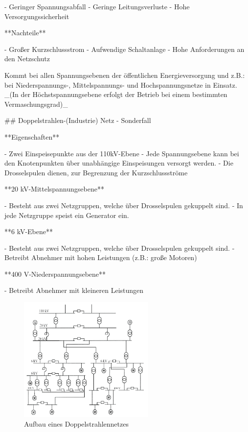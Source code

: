 \begin{markdown}
- Geringer Spannungsabfall
- Geringe Leitungsverluste
- Hohe Versorgungssicherheit

**Nachteile**

- Großer Kurzschlussstrom
- Aufwendige Schaltanlage
- Hohe Anforderungen an den Netzschutz

Kommt bei allen Spannungsebenen der öffentlichen Energieversorgung und z.B.: bei Niederspannungs-, Mittelspannungs- und Hochspannungsnetze in Einsatz. _(In der Höchstspannungsebene erfolgt der Betrieb bei einem bestimmten Vermaschungsgrad)_

\newpage

## Doppelstrahlen-(Industrie) Netz - Sonderfall

**Eigenschaften**

- Zwei Einspeisepunkte aus der 110kV-Ebene
- Jede Spannungsebene kann bei den Knotenpunkten über unabhängige Einspeisungen versorgt werden.
- Die Drosselspulen dienen, zur Begrenzung der Kurzschlussströme

**20 kV-Mittelspannungsebene**

- Besteht aus zwei Netzgruppen, welche über Drosselspulen gekuppelt sind.
- In jede Netzgruppe speist ein Generator ein.

**6 kV-Ebene**

- Besteht aus zwei Netzgruppen, welche über Drosselspulen gekuppelt sind.
- Betreibt Abnehmer mit hohen Leistungen (z.B.: große Motoren)

**400 V-Niederspannungsebene**

- Betreibt Abnehmer mit kleineren Leistungen

\begin{figure}[H]
    \centering
    \includegraphics[width=0.6\textwidth]{./images/01-Netze/Doppelstrahlennetz.png}
    \caption[Aufbau eines Doppelstrahlennetzes]{Aufbau eines Doppelstrahlennetzes}
\end{figure}


\end{markdown}
